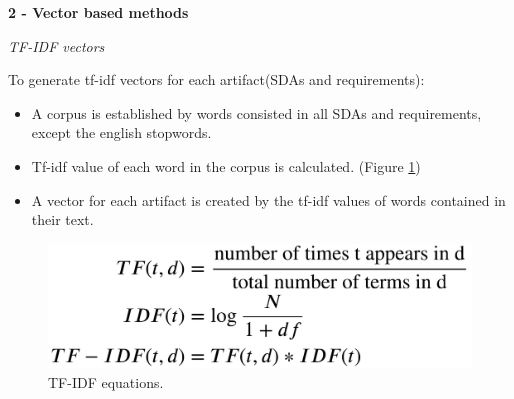 

\textbf{2 - Vector based methods}

\textit{TF-IDF vectors}

To generate tf-idf vectors for each artifact(SDAs and requirements):

\begin{itemize}
    \item A corpus is established by words consisted in all SDAs and requirements, except the english stopwords.
    \item Tf-idf value of each word in the corpus is calculated. (Figure \ref{fig:tfidf})
    \item A vector for each artifact is created by the tf-idf values of words contained in their text.
\end{itemize}


\begin{figure}[htb]
    \centering
    \includegraphics[width=0.75\linewidth]{figs/tfidf.png}
    \caption{TF-IDF equations.}
    \label{fig:tfidf}
\end{figure}

